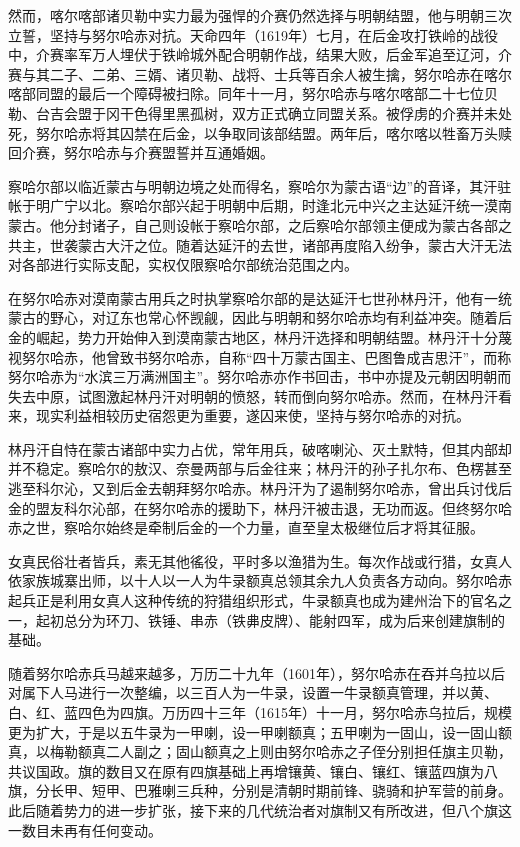然而，喀尔喀部诸贝勒中实力最为强悍的介赛仍然选择与明朝结盟，他与明朝三次立誓，坚持与努尔哈赤对抗。天命四年（1619年）七月，在后金攻打铁岭的战役中，介赛率军万人埋伏于铁岭城外配合明朝作战，结果大败，后金军追至辽河，介赛与其二子、二弟、三婿、诸贝勒、战将、士兵等百余人被生擒，努尔哈赤在喀尔喀部同盟的最后一个障碍被扫除。同年十一月，努尔哈赤与喀尔喀部二十七位贝勒、台吉会盟于冈干色得里黑孤树，双方正式确立同盟关系。被俘虏的介赛并未处死，努尔哈赤将其囚禁在后金，以争取同该部结盟。两年后，喀尔喀以牲畜万头赎回介赛，努尔哈赤与介赛盟誓并互通婚姻。

察哈尔部以临近蒙古与明朝边境之处而得名，察哈尔为蒙古语“边”的音译，其汗驻帐于明广宁以北。察哈尔部兴起于明朝中后期，时逢北元中兴之主达延汗统一漠南蒙古。他分封诸子，自己则设帐于察哈尔部，之后察哈尔部领主便成为蒙古各部之共主，世袭蒙古大汗之位。随着达延汗的去世，诸部再度陷入纷争，蒙古大汗无法对各部进行实际支配，实权仅限察哈尔部统治范围之内。

在努尔哈赤对漠南蒙古用兵之时执掌察哈尔部的是达延汗七世孙林丹汗，他有一统蒙古的野心，对辽东也常心怀觊觎，因此与明朝和努尔哈赤均有利益冲突。随着后金的崛起，势力开始伸入到漠南蒙古地区，林丹汗选择和明朝结盟。林丹汗十分蔑视努尔哈赤，他曾致书努尔哈赤，自称“四十万蒙古国主、巴图鲁成吉思汗”，而称努尔哈赤为“水滨三万满洲国主”。努尔哈赤亦作书回击，书中亦提及元朝因明朝而失去中原，试图激起林丹汗对明朝的愤怒，转而倒向努尔哈赤。然而，在林丹汗看来，现实利益相较历史宿怨更为重要，遂囚来使，坚持与努尔哈赤的对抗。

林丹汗自恃在蒙古诸部中实力占优，常年用兵，破喀喇沁、灭土默特，但其内部却并不稳定。察哈尔的敖汉、奈曼两部与后金往来；林丹汗的孙子扎尔布、色楞甚至逃至科尔沁，又到后金去朝拜努尔哈赤。林丹汗为了遏制努尔哈赤，曾出兵讨伐后金的盟友科尔沁部，在努尔哈赤的援助下，林丹汗被击退，无功而返。但终努尔哈赤之世，察哈尔始终是牵制后金的一个力量，直至皇太极继位后才将其征服。

女真民俗壮者皆兵，素无其他徭役，平时多以渔猎为生。每次作战或行猎，女真人依家族城寨出师，以十人以一人为牛录额真总领其余九人负责各方动向。努尔哈赤起兵正是利用女真人这种传统的狩猎组织形式，牛录额真也成为建州治下的官名之一，起初总分为环刀、铁锤、串赤（铁丳皮牌）、能射四军，成为后来创建旗制的基础。

随着努尔哈赤兵马越来越多，万历二十九年（1601年），努尔哈赤在吞并乌拉以后对属下人马进行一次整编，以三百人为一牛录，设置一牛录额真管理，并以黄、白、红、蓝四色为四旗。万历四十三年（1615年）十一月，努尔哈赤乌拉后，规模更为扩大，于是以五牛录为一甲喇，设一甲喇额真；五甲喇为一固山，设一固山额真，以梅勒额真二人副之；固山额真之上则由努尔哈赤之子侄分别担任旗主贝勒，共议国政。旗的数目又在原有四旗基础上再增镶黄、镶白、镶红、镶蓝四旗为八旗，分长甲、短甲、巴雅喇三兵种，分别是清朝时期前锋、骁骑和护军营的前身。此后随着势力的进一步扩张，接下来的几代统治者对旗制又有所改进，但八个旗这一数目未再有任何变动。

